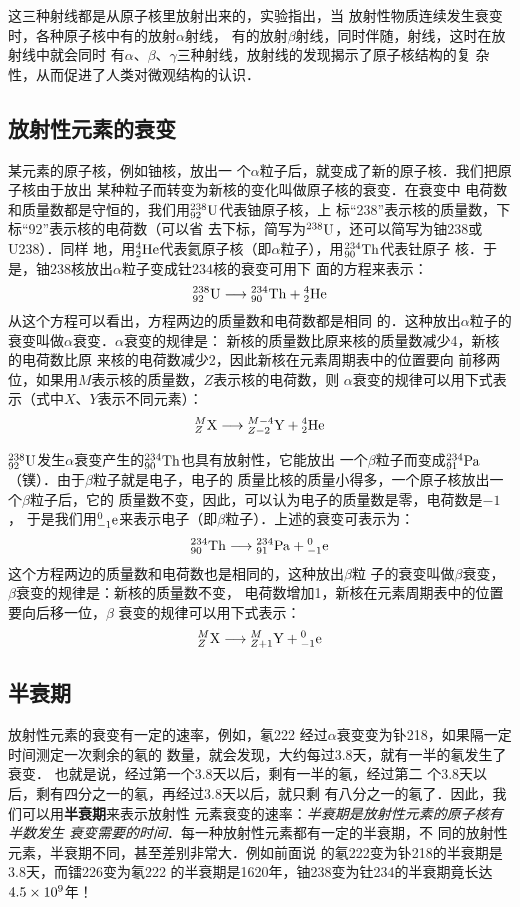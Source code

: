 这三种射线都是从原子核里放射出来的，实验指出，当
放射性物质连续发生衰变时，各种原子核中有的放射$\alpha$射线，
有的放射$\beta$射线，同时伴随，射线，这时在放射线中就会同时
有$\alpha$、$\beta$、$\gamma$三种射线，放射线的发现揭示了原子核结构的复
杂性，从而促进了人类对微观结构的认识．

\subsection{放射性元素的衰变}

某元素的原子核，例如铀核，放出一
个$\alpha$粒子后，就变成了新的原子核．我们把原子核由于放出
某种粒子而转变为新核的变化叫做原子核的衰变．在衰变中
电荷数和质量数都是守恒的，我们用$\atom{U}{238}{92}$代表铀原子核，上
标“238”表示核的质量数，下标“92”表示核的电荷数（可以省
去下标，简写为$\atom{U}{238}{}$，还可以简写为铀238或U238）．同样
地，用$\atom{He}{4}{2}$代表氦原子核（即$\alpha$粒子），用$\atom{Th}{234}{90}$代表钍原子
核．于是，铀238核放出$\alpha$粒子变成钍234核的衰变可用下
面的方程来表示：
\[\atom{U}{238}{92}\longrightarrow \atom{Th}{234}{90}+\atom{He}{4}{2}\]
从这个方程可以看出，方程两边的质量数和电荷数都是相同
的．这种放出$\alpha$粒子的衰变叫做$\alpha$衰变．$\alpha$衰变的规律是：
新核的质量数比原来核的质量数减少4，新核的电荷数比原
来核的电荷数减少2，因此新核在元素周期表中的位置要向
前移两位，如果用$M$表示核的质量数，$Z$表示核的电荷数，则
$\alpha$衰变的规律可以用下式表示（式中$X$、$Y$表示不同元素）：
\[\atom{X}{M}{Z}\longrightarrow \atom{Y}{M-4}{Z-2}+\atom{He}{4}{2}   \]

$\atom{U}{238}{92}$发生$\alpha$衰变产生的$\atom{Th}{234}{90}$也具有放射性，它能放出
一个$\beta$粒子而变成$\atom{Pa}{234}{91}$（镤）．由于$\beta$粒子就是电子，电子的
质量比核的质量小得多，一个原子核放出一个$\beta$粒子后，它的
质量数不变，因此，可以认为电子的质量数是零，电荷数是$-1$，
于是我们用$\atom{e}{0}{-1}$来表示电子（即$\beta$粒子）．上述的衰变可表示为：
\[\atom{Th}{234}{90}\longrightarrow \atom{Pa}{234}{91}+ \atom{e}{0}{-1}\]
这个方程两边的质量数和电荷数也是相同的，这种放出$\beta$粒
子的衰变叫做$\beta$衰变，$\beta$衰变的规律是：新核的质量数不变，
电荷数增加1，新核在元素周期表中的位置要向后移一位，$\beta$
衰变的规律可以用下式表示：
\[\atom{X}{M}{Z}\longrightarrow \atom{Y}{M}{Z+1}+ \atom{e}{0}{-1}\]



\subsection{半衰期}
放射性元素的衰变有一定的速率，例如，氡222
经过$\alpha$衰变变为钋218，如果隔一定时间测定一次剩余的氡的
数量，就会发现，大约每过3.8天，就有一半的氡发生了衰变．
也就是说，经过第一个3.8天以后，剩有一半的氡，经过第二
个3.8天以后，剩有四分之一的氡，再经过3.8天以后，就只剩
有八分之一的氡了．因此，我们可以用\textbf{半衰期}来表示放射性
元素衰变的速率：\textit{半衰期是放射性元素的原子核有半数发生
衰变需要的时间}．每一种放射性元素都有一定的半衰期，不
同的放射性元素，半衰期不同，甚至差别非常大．例如前面说
的氡222变为钋218的半衰期是3.8天，而镭226变为氡222
的半衰期是1620年，铀238变为钍234的半衰期竟长达$4.5
\x10^9$年！

